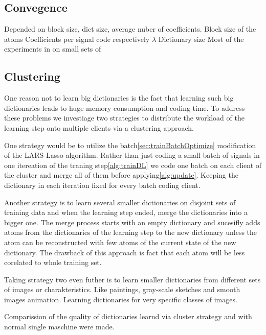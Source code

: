 \subsection{Convegence}

Depended on block size, dict size, average nuber of coefficients.
Block size of the atoms
Coefficients per signal code respectively $\lambda$
Dictionary size 
Most of the experiments in on small sets of 

\subsection{Clustering}
One reason not to learn big dictionaries is the fact that learning such big
dictionaries leads to huge memory consumption and coding time.
To address these problems we investiage two strategies to distribute the
workload of the learning step onto multiple clients via a clustering approach.

One strategy would be to utilize the batch\ref{sec:trainBatchOptimize}
modification of the LARS-Lasso algorithm. Rather than just coding a small batch
of signals in one itereation of the traning step\ref{alg:trainDL} we code one
batch on each client of the cluster and merge all of them before
applying\ref{alg:update}. Keeping the dictionary in each iteration fixed
for every batch coding client. 

Another strategy is to learn several smaller dictionaries on disjoint sets of
training data and when the learning step ended, merge the dictionaries
into a bigger one. The merge process starts with an empty dictionary and
sucesifly adds atoms from the dictionaries of the learning step to the
new dictionary unless the atom can be reconstructed with few atoms of the
current state of the new dictionary. The drawback of this approach is fact that 
each atom will be less corelated to whole training set.

Taking strategy two even futher is to learn smaller dictionaries from different
sets of images or charakteristics. Like paintings, gray-scale sketches and
smooth images animation. Learning dictionaries for very specific classes of
images.

Comparission of the quality of dictionaries learnd via cluster strategy and
with normal single maschine were made.


